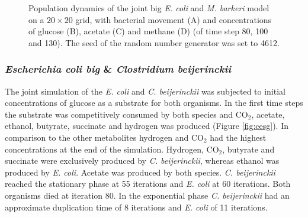 \begin{figure}[h!]
{\begin{minipage}[t]{0.3\textwidth}
  \end{minipage}
  }
  \caption{Population dynamics of the joint big \emph{E. coli} and \emph{M. barkeri} model on a $20\times20$ grid, with bacterial movement (A) and concentrations of glucose (B), acetate (C) and methane (D) (of time step 80, 100 and 130). The seed of the random number generator was set to 4612.}
  \label{fig:begrid}
\end{figure}

\subsubsection{\textit{Escherichia coli big} \& \textit{Clostridium beijerinckii}}
The joint simulation of the \textit{E. coli} and \textit{C. beijerinckii} was subjected to initial concentrations of glucose as a substrate for both organisms. In the first time steps the substrate was competitively consumed by both species and CO$_2$, acetate, ethanol, butyrate, succinate and hydrogen was produced (Figure \hyperref[fig:cesg]{\ref{fig:cesg}}). In comparison to the other metabolites hydrogen and CO$_2$ had the highest concentrations at the end of the simulation.
Hydrogen, CO$_2$, butyrate and succinate were exclusively produced by \textit{C. beijerinckii}, whereas ethanol was produced by \textit{E. coli}. 
Acetate was produced by both species. \textit{C. beijerinckii} reached the stationary phase at 55 iterations and \textit{E. coli} at 60 iterations. Both organisms died at iteration 80. In the exponential phase \textit{C. beijerinckii} had an approximate duplication time of 8 iterations and \textit{E. coli} of 11 iterations.

